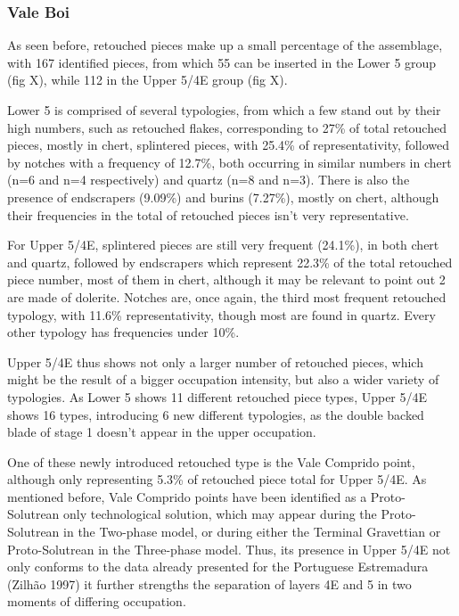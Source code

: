 \documentclass[12pt,twoside]{reedthesis}
\begin{document}
\hypertarget{vale-boi-7}{%
\subsubsection{Vale Boi}\label{vale-boi-7}}

As seen before, retouched pieces make up a small percentage of the assemblage, with 167 identified pieces, from which 55 can be inserted in the Lower 5 group (fig X), while 112 in the Upper 5/4E group (fig X).

Lower 5 is comprised of several typologies, from which a few stand out by their high numbers, such as retouched flakes, corresponding to 27\% of total retouched pieces, mostly in chert, splintered pieces, with 25.4\% of representativity, followed by notches with a frequency of 12.7\%, both occurring in similar numbers in chert (n=6 and n=4 respectively) and quartz (n=8 and n=3).
There is also the presence of endscrapers (9.09\%) and burins (7.27\%), mostly on chert, although their frequencies in the total of retouched pieces isn't very representative.

For Upper 5/4E, splintered pieces are still very frequent (24.1\%), in both chert and quartz, followed by endscrapers which represent 22.3\% of the total retouched piece number, most of them in chert, although it may be relevant to point out 2 are made of dolerite. Notches are, once again, the third most frequent retouched typology, with 11.6\% representativity, though most are found in quartz. Every other typology has frequencies under 10\%.

Upper 5/4E thus shows not only a larger number of retouched pieces, which might be the result of a bigger occupation intensity, but also a wider variety of typologies. As Lower 5 shows 11 different retouched piece types, Upper 5/4E shows 16 types, introducing 6 new different typologies, as the double backed blade of stage 1 doesn't appear in the upper occupation.

One of these newly introduced retouched type is the Vale Comprido point, although only representing 5.3\% of retouched piece total for Upper 5/4E. As mentioned before, Vale Comprido points have been identified as a Proto-Solutrean only technological solution, which may appear during the Proto-Solutrean in the Two-phase model, or during either the Terminal Gravettian or Proto-Solutrean in the Three-phase model. Thus, its presence in Upper 5/4E not only conforms to the data already presented for the Portuguese Estremadura (Zilhão 1997) it further strengths the separation of layers 4E and 5 in two moments of differing occupation.
\end{document}
